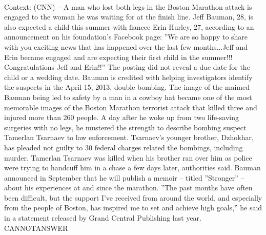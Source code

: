\documentclass[11pt,a4paper, onecolumn]{article}
\begin{document}
\\ Context: (CNN) -- A man who lost both legs in the Boston Marathon attack is engaged to the woman he was waiting for at the finish line. Jeff Bauman, 28, is also expected a child this summer with fiancee Erin Hurley, 27, according to an announcement on his foundation's Facebook page: ''We are so happy to share with you exciting news that has happened over the last few months...Jeff and Erin became engaged and are expecting their first child in the summer!!! Congratulations Jeff and Erin!!'' The posting did not reveal a due date for the child or a wedding date. Bauman is credited with helping investigators identify the suspects in the April 15, 2013, double bombing. The image of the maimed Bauman being led to safety by a man in a cowboy hat became one of the most memorable images of the Boston Marathon terrorist attack that killed three and injured more than 260 people. A day after he woke up from two life-saving surgeries with no legs, he mustered the strength to describe bombing suspect Tamerlan Tsarnaev to law enforcement. Tsarnaev's younger brother, Dzhokhar, has pleaded not guilty to 30 federal charges related the bombings, including murder. Tamerlan Tsarnaev was killed when his brother ran over him as police were trying to handcuff him in a chase a few days later, authorities said. Bauman announced in September that he will publish a memoir -- titled ''Stronger'' -- about his experiences at and since the marathon. ''The past months have often been difficult, but the support I've received from around the world, and especially from the people of Boston, has inspired me to set and achieve high goals,'' he said in a statement released by Grand Central Publishing last year. CANNOTANSWER
\end{document}

